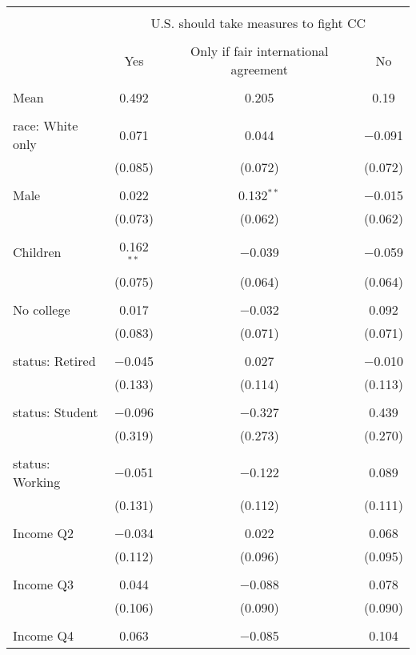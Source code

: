 
\begin{tabular}{@{\extracolsep{5pt}}lccc} 
\\[-1.8ex]\hline 
\hline \\[-1.8ex] 
 & \multicolumn{3}{c}{U.S. should take measures to fight CC} \\ 
\cline{2-4} 
\\[-1.8ex] & Yes & Only if fair international agreement & No \\ 
\hline \\[-1.8ex] 
 Mean & 0.492 & 0.205 & 0.19  \\ \hline \\[-1.8ex] race: White only & 0.071 & 0.044 & $-$0.091 \\ 
  & (0.085) & (0.072) & (0.072) \\ 
  & & & \\ 
 Male & 0.022 & 0.132$^{**}$ & $-$0.015 \\ 
  & (0.073) & (0.062) & (0.062) \\ 
  & & & \\ 
 Children & 0.162$^{**}$ & $-$0.039 & $-$0.059 \\ 
  & (0.075) & (0.064) & (0.064) \\ 
  & & & \\ 
 No college & 0.017 & $-$0.032 & 0.092 \\ 
  & (0.083) & (0.071) & (0.071) \\ 
  & & & \\ 
 status: Retired & $-$0.045 & 0.027 & $-$0.010 \\ 
  & (0.133) & (0.114) & (0.113) \\ 
  & & & \\ 
 status: Student & $-$0.096 & $-$0.327 & 0.439 \\ 
  & (0.319) & (0.273) & (0.270) \\ 
  & & & \\ 
 status: Working & $-$0.051 & $-$0.122 & 0.089 \\ 
  & (0.131) & (0.112) & (0.111) \\ 
  & & & \\ 
 Income Q2 & $-$0.034 & 0.022 & 0.068 \\ 
  & (0.112) & (0.096) & (0.095) \\ 
  & & & \\ 
 Income Q3 & 0.044 & $-$0.088 & 0.078 \\ 
  & (0.106) & (0.090) & (0.090) \\ 
  & & & \\ 
 Income Q4 & 0.063 & $-$0.085 & 0.104 \\ 

\end{tabular}
